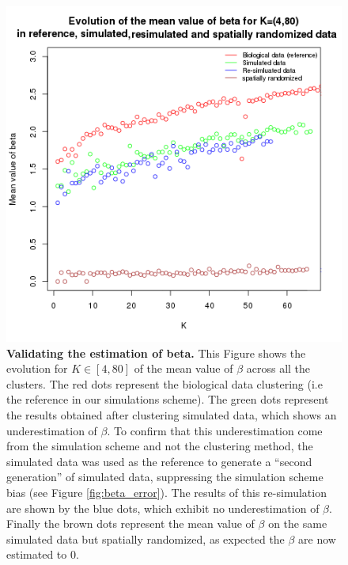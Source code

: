 	\begin{figure}[H]
\centerline{\includegraphics[width=0.8\linewidth]{gfx/chapter5/beta_valid.png}}
\caption{{\bf Validating the estimation of beta.} This Figure shows the evolution for $K \in [4,80]$ of the mean value of $\beta$ across all the clusters. The red dots represent the biological data clustering (i.e the reference in our simulations scheme). The green dots represent the results obtained after clustering simulated data, which shows an underestimation of $\beta$. To confirm that this underestimation come from the simulation scheme and not the clustering method, the simulated data was used as the reference to generate a ``second generation'' of simulated data, suppressing the simulation scheme bias (see Figure \ref{fig:beta_error}). The results of this re-simulation are shown by the blue dots, which exhibit no underestimation of $\beta$. Finally the brown dots represent the mean value of $\beta$ on the same simulated data but spatially randomized, as expected the $\beta$ are now estimated to $0$.}
\label{fig:beta_validation}
	\end{figure}
	
